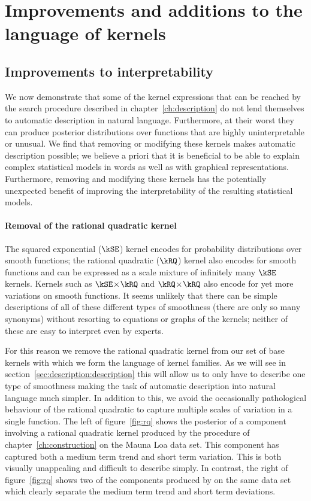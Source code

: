 \section{Improvements and additions to the language of kernels}
\label{sec:design}

\subsection{Improvements to interpretability}

We now demonstrate that some of the kernel expressions that can be reached by the search procedure described in chapter~\ref{ch:description} do not lend themselves to automatic description in natural language.
Furthermore, at their worst they can produce posterior distributions over functions that are highly uninterpretable or unusual.
We find that removing or modifying these kernels makes automatic description possible; we believe a priori that it is beneficial to be able to explain complex statistical models in words as well as with graphical representations.
Furthermore, removing and modifying these kernels has the potentially unexpected benefit of improving the interpretability of the resulting statistical models.

\paragraph{Removal of the rational quadratic kernel}

The squared exponential ($\kSE$)  kernel encodes for probability distributions over smooth functions; the rational quadratic ($\kRQ$) kernel also encodes for smooth functions and can be expressed as a scale mixture of infinitely many $\kSE$ kernels.
Kernels such as $\kSE \kerntimes \kRQ$ and $\kRQ \kerntimes \kRQ$ also encode for yet more variations on smooth functions.
It seems unlikely that there can be simple descriptions of all of these different types of smoothness (there are only so many synonyms) without resorting to equations or graphs of the kernels; neither of these are easy to interpret even by experts.

For this reason we remove the rational quadratic kernel from our set of base kernels with which we form the language of kernel families.
As we will see in section~\ref{sec:description:description} this will allow us to only have to describe one type of smoothness making the task of automatic description into natural language much simpler.
In addition to this, we avoid the occasionally pathological behaviour of the rational quadratic to capture multiple scales of variation in a single function.
The left of figure~\ref{fig:rq} shows the posterior of a component involving a rational quadratic kernel produced by the procedure of chapter~\ref{ch:construction} on the Mauna Loa data set.
This component has captured both a medium term trend and short term variation.
This is both visually unappealing and difficult to describe simply.
In contrast, the right of figure~\ref{fig:rq} shows two of the components produced by \procedurename{} on the same data set which clearly separate the medium term trend and short term deviations.

